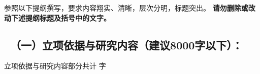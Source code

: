 {\sihao \kaishu 参照以下提纲撰写，要求内容翔实、清晰，层次分明，标题突出。{\color{MsBlue} \bfseries 请勿删除或改动下述提纲标题及括号中的文字。}}
\vskip -5mm
{\color{MsBlue} \subsection{\texorpdfstring{\sihao \kaishu \quad \ （一）立项依据与研究内容（建议8000字以下）： }{（一）立项依据与研究内容（建议8000字以下）：}}}




% 



% 



% 



% 



% 



\ifhandout
\else
\begin{center}
{\larger[2]\color{red}  立项依据与研究内容部分共计 \wordcount 字 }
\end{center}
\fi
